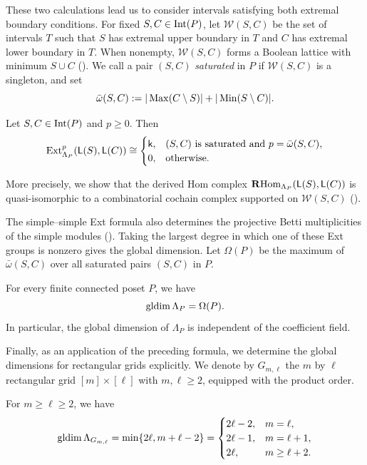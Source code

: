 These two calculations lead us to consider intervals satisfying both
extremal boundary conditions.
For fixed $S,C\in\operatorname{Int}(P)$, let $\mathcal W(S,C)$ be the set of intervals
$T$ such that $S$ has extremal upper boundary in $T$ and $C$ has
extremal lower boundary in $T$.
When nonempty, $\mathcal W(S,C)$ forms a
Boolean lattice with minimum $S\cup C$
().
We call a pair $(S,C)$ \emph{saturated} in $P$ if
$\mathcal W(S,C)$ is a singleton, and set
\[
\bar\omega(S,C)
:=
|\operatorname{Max}(C\setminus S)|
+
|\operatorname{Min}(S\setminus C)|.
\]

\begin{theorem}
Let $S,C\in\operatorname{Int}(P)$ and $p\geq0$.  Then
\[
\operatorname{Ext}^p_{\Lambda_P}(\mathsf L(S),\mathsf L(C))
\cong
\begin{cases}
\mathsf{k},
&
(S,C)\text{ is saturated and }
p=\bar\omega(S,C),\\
0,
&
\text{otherwise}.
\end{cases}
\]
\end{theorem}

More precisely, we show that the derived Hom complex
$\mathbf R\!\operatorname{Hom}_{\Lambda_P}(\mathsf L(S),\mathsf L(C))$ is quasi-isomorphic to a
combinatorial cochain complex supported on $\mathcal W(S,C)$
().

The simple--simple Ext formula also determines the projective Betti
multiplicities of the simple modules
().  Taking the largest
degree in which one of these Ext groups is nonzero gives the global
dimension.  Let $\Omega(P)$ be the maximum of $\bar\omega(S,C)$ over all
saturated pairs $(S,C)$ in $P$.

\begin{theorem}
For every finite connected poset $P$, we have
\[
\operatorname{gldim}\Lambda_P=\Omega(P).
\]
In particular, the global dimension of $\Lambda_P$ is independent of the
coefficient field.
\end{theorem}

Finally, as an application of the preceding formula, we determine the
global dimensions for rectangular grids explicitly.  We denote by
$G_{m,\ell}$ the $m$ by $\ell$ rectangular grid $[m]\times[\ell]$ with $m,\ell\geq 2$, equipped with the product order.

\begin{theorem}
\label{intro:grid-exact-formula}
For $m\geq\ell\geq2$, we have 
\[
\operatorname{gldim}\Lambda_{G_{m,\ell}}
=\min\{2\ell,m+\ell-2\} = 
\begin{cases}
2\ell-2,
& m=\ell,
\\
2\ell-1,
& m=\ell+1,
\\
2\ell,
& m\geq\ell+2.
\end{cases}
\]
\end{theorem}

